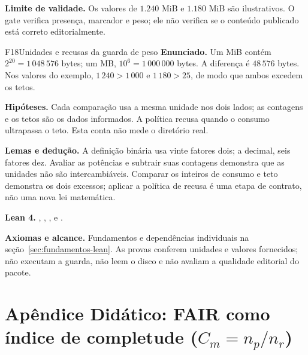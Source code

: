 \begin{aviso}
\textbf{Limite de validade.} Os valores de $1.240$ MiB e $1.180$ MiB são ilustrativos. O gate verifica presença, marcador e peso; ele não verifica se o conteúdo publicado está correto editorialmente.
\end{aviso}

\clearpage
\begin{formalizacao}{F18}{Unidades e recusas da guarda de peso}
\textbf{Enunciado.} Um MiB contém $2^{20}=1\,048\,576$ bytes; um MB,
$10^6=1\,000\,000$ bytes. A diferença é $48\,576$ bytes. Nos valores do
exemplo, $1\,240>1\,000$ e $1\,180>25$, de modo que ambos excedem os tetos.

\textbf{Hipóteses.} Cada comparação usa a mesma unidade nos dois lados;
as contagens e os tetos são os dados informados. A política recusa quando
o consumo ultrapassa o teto. Esta conta não mede o diretório real.

\textbf{Lemas e dedução.} A definição binária usa vinte fatores dois;
a decimal, seis fatores dez. Avaliar as potências e subtrair suas
contagens demonstra que as unidades não são intercambiáveis. Comparar
os inteiros de consumo e teto demonstra os dois excessos; aplicar a
política de recusa é uma etapa de contrato, não uma nova lei matemática.

\textbf{Lean 4.} ,
,
,
 e
.

\textbf{Axiomas e alcance.} Fundamentos e dependências individuais na
seção~\ref{sec:fundamentos-lean}. As provas conferem unidades e valores
fornecidos; não executam a guarda, não leem o disco e não avaliam a
qualidade editorial do pacote.
\end{formalizacao}

\clearpage

\section[Apêndice Didático: FAIR como índice de completude]{Apêndice Didático: FAIR como índice de completude ($C_m = n_p/n_r$)}


